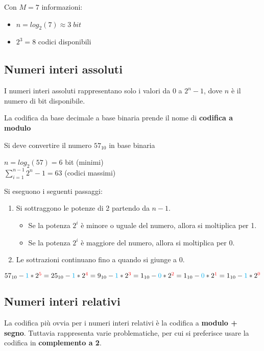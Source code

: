 \documentclass[a4paper]{article}
\theoremstyle{break}
\theoremstyle{break}
\theoremstyle{break}
\theoremstyle{break}
\begin{document}
\begin{example}
	Con \( M=7 \) informazioni:
	\begin{itemize}
		\item \( n=log_2{(7)} \approx 3\; bit \)
		\item \( 2^3=8 \) codici disponibili
	\end{itemize}
\end{example}

\subsection{Numeri interi assoluti}
I numeri interi assoluti rappresentano solo i valori da \( 0 \) a \( 2^n-1 \),
dove \( n \) è il numero di bit disponibile.

La codifica da base decimale a base binaria prende il nome di \textbf{codifica
	a modulo}

\begin{example}
	\label{ex:57modulo}
	Si deve convertire il numero \( 57_{10} \) in base binaria
	\begin{center}
		\( n=log_2{(57)} = 6 \) bit (minimi)\\
		\( \sum_{i=1}^{n-1} 2^n-1 = 63 \) (codici massimi)
	\end{center}
	Si eseguono i seguenti passaggi:
	\begin{enumerate}
		\item Si sottraggono le potenze di 2 partendo da \( n-1 \).
		      \begin{itemize}
			      \item Se la potenza \( 2^i \) è minore o uguale del numero,
			            allora si moltiplica per 1.
			      \item Se la potenza \( 2^i \) è maggiore del numero,
			            allora si moltiplica per 0.
		      \end{itemize}
		\item Le sottrazioni continuano fino a quando si giunge a 0.
	\end{enumerate}
	\(57_{10}-{\textcolor{cyan}{1}}*2^{\textcolor{red}{5}}
		=25_{10}-{\textcolor{cyan}{1}}*2^{\textcolor{red}{4}}
		=9_{10}-{\textcolor{cyan}{1}}*2^{\textcolor{red}{3}}
		=1_{10}-{\textcolor{cyan}{0}}*2^{\textcolor{red}{2}}
		=1_{10}-{\textcolor{cyan}{0}}*2^{\textcolor{red}{1}}
		=1_{10}-{\textcolor{cyan}{1}}*2^{\textcolor{red}{0}}\)
\end{example}

\subsection{Numeri interi relativi}
La codifica più ovvia per i numeri interi relativi è la codifica a
\textbf{modulo + segno}. Tuttavia rappresenta varie problematiche, per cui
si preferisce usare la codifica in \textbf{complemento a 2}.
\end{document}
